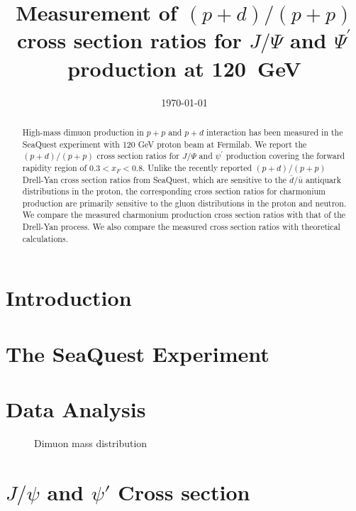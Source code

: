 \documentclass[twocolumn,aps,unsortedaddress,superscriptaddress,prd,floatfix,showpacs,linenumbers]{revtex4-2}
\begin{document}
\title{Measurement of $(p+d) / (p+p)$ cross section ratios for
$J/\Psi$ and $\Psi^\prime$ production at \SI{120}{\GeV}}


\date{\today}
\begin{abstract}
High-mass dimuon production in $p+p$ and $p+d$ interaction has been measured
in the SeaQuest experiment with 120 GeV proton beam at Fermilab.
We report the $(p+d) / (p+p)$ cross section
ratios for $J/\Psi$ and $\psi^\prime$ production covering the forward
rapidity region of $0.3 < x_F <0.8$. Unlike the recently reported
$(p+d) / (p+p)$ Drell-Yan cross section ratios from SeaQuest, which are
sensitive to the
$\bar d / \bar u$ antiquark distributions in the proton, the corresponding
cross section ratios for charmonium production are primarily
sensitive to the gluon
distributions in the proton and neutron. We compare the measured
charmonium production cross section ratios with that of the
Drell-Yan process. We also compare the measured cross section ratios with
theoretical calculations.

\end{abstract}


\maketitle
\section{Introduction}

\section{The SeaQuest Experiment}

\section{Data Analysis}
\begin{figure}
\caption{Dimuon mass distribution }
\label{fig:massfit}
\end{figure}

\section{$J/\psi$ and $\psi'$ Cross section}

\nocite{*}

\end{document}
